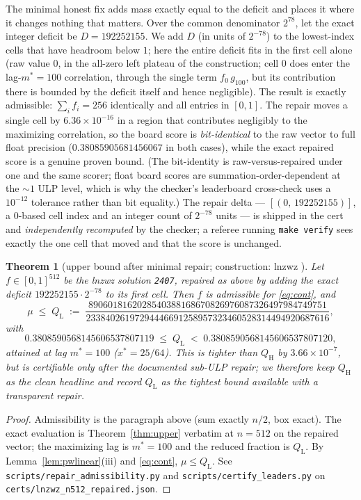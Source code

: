 \documentclass[11pt]{article}
\newtheorem{theorem}{Theorem}
\theoremstyle{remark}
\begin{document}
The minimal honest fix adds mass exactly equal to the deficit and places it
where it changes nothing that matters. Over the common denominator $2^{78}$, let
the exact integer deficit be $D = 192252155$. We add $D$ (in units of $2^{-78}$)
to the lowest-index cells that have headroom below $1$; here the entire deficit
fits in the first cell alone (raw value $0$, in the all-zero left plateau of the
construction; cell $0$ does enter the lag-$m^\ast = 100$ correlation, through
the single term $f_0\,g_{100}$, but its contribution there is bounded by the
deficit itself and hence negligible). The result is exactly
admissible: $\sum_i f_i = 256$ identically and all entries in $[0,1]$. The repair
moves a single cell by $6.36\times10^{-16}$ in a region that contributes
negligibly to the maximizing correlation, so the board score is
\emph{bit-identical} to the raw vector to full float precision
($0.38085905681456067$ in both cases), while the exact repaired score is a
genuine proven bound. (The bit-identity is raw-versus-repaired under one and
the same scorer; float board scores are summation-order-dependent at the
$\sim 1$ ULP level, which is why the checker's leaderboard cross-check uses a
$10^{-12}$ tolerance rather than bit equality.) The repair delta --- $[(0,\,192252155)]$, a $0$-based cell
index and an integer count of $2^{-78}$ units --- is shipped in the cert and
\emph{independently recomputed} by the checker; a referee running
\texttt{make verify} sees exactly the one cell that moved and that the score is
unchanged.

\begin{theorem}[upper bound after minimal repair; construction: lnzwz
\cite{Arena26}]
\label{thm:lnzwz}
Let $f \in [0,1]^{512}$ be the lnzwz solution \texttt{2407}, repaired as above
by adding the exact deficit $192252155 \cdot 2^{-78}$ to its first cell. Then
$f$ is admissible for \eqref{eq:cont}, and
\[
\mu \;\le\; Q_{\mathrm L} \;:=\;
\frac{8906018162028540388168670826976087326497984749751}
     {23384026197294446691258957323460528314494920687616},
\]
with
\[
0.3808590568145606537807119 \;\le\; Q_{\mathrm L} \;<\;
0.3808590568145606537807120 ,
\]
attained at lag $m^\ast = 100$ ($x^\ast = 25/64$). This is tighter than
$Q_{\mathrm H}$ by $3.66\times10^{-7}$, but is certifiable only after the
documented sub-ULP repair; we therefore keep $Q_{\mathrm H}$ as the clean
headline and record $Q_{\mathrm L}$ as the tightest bound available with a
transparent repair.
\end{theorem}

\begin{proof}
Admissibility is the paragraph above (sum exactly $n/2$, box exact). The exact
evaluation is Theorem~\ref{thm:upper} verbatim at $n = 512$ on the repaired
vector; the maximizing lag is $m^\ast = 100$ and the reduced fraction is
$Q_{\mathrm L}$. By Lemma~\ref{lem:pwlinear}(iii) and \eqref{eq:cont},
$\mu \le Q_{\mathrm L}$. See \texttt{scripts/repair\_admissibility.py} and
\texttt{scripts/certify\_leaders.py} on
\texttt{certs/lnzwz\_n512\_repaired.json}.
\end{proof}
\end{document}
